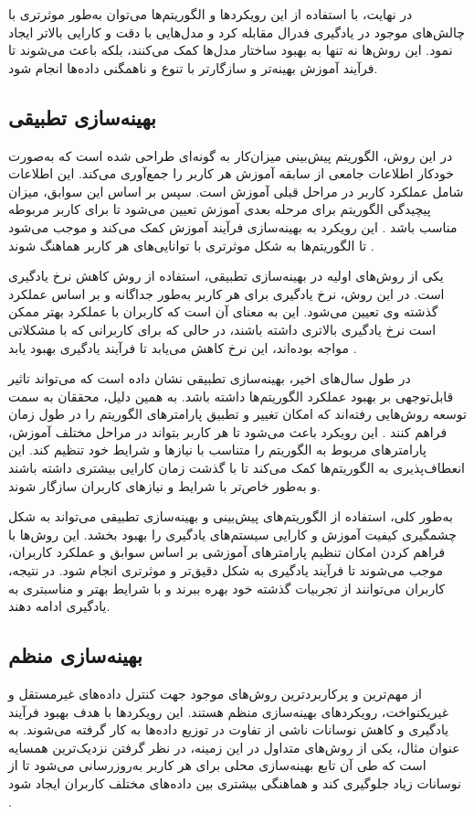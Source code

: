 در نهایت، با استفاده از این رویکردها و الگوریتم‌ها می‌توان به‌طور موثرتری با چالش‌های موجود در یادگیری فدرال مقابله کرد و مدل‌هایی با دقت و کارایی بالاتر ایجاد نمود. این روش‌ها نه تنها به بهبود ساختار مدل‌ها کمک می‌کنند، بلکه باعث می‌شوند تا فرآیند آموزش بهینه‌تر و سازگارتر با تنوع و ناهمگنی داده‌ها انجام شود.


\subsection{
	بهینه‌سازی تطبیقی%
}
در این روش، الگوریتم پیش‌بینی میزان‌کار به گونه‌ای طراحی شده است که به‌صورت خودکار اطلاعات جامعی از سابقه آموزش هر کاربر را جمع‌آوری می‌کند. این اطلاعات شامل عملکرد کاربر در مراحل قبلی آموزش است. سپس بر اساس این سوابق، میزان پیچیدگی الگوریتم برای مرحله بعدی آموزش تعیین می‌شود تا برای کاربر مربوطه مناسب باشد . این رویکرد به بهینه‌سازی فرآیند آموزش کمک می‌کند و موجب می‌شود تا الگوریتم‌ها به شکل موثرتری با توانایی‌های هر کاربر هماهنگ شوند
\cite{li2021fedsae}.

یکی از روش‌های اولیه در بهینه‌سازی تطبیقی، استفاده از روش کاهش نرخ یادگیری است. در این روش، نرخ یادگیری برای هر کاربر به‌طور جداگانه و بر اساس عملکرد گذشته وی تعیین می‌شود. این به معنای آن است که کاربران با عملکرد بهتر ممکن است نرخ یادگیری بالاتری داشته باشند، در حالی که برای کاربرانی که با مشکلاتی مواجه بوده‌اند، این نرخ کاهش می‌یابد تا فرآیند یادگیری بهبود یابد
\cite{reddi2020adaptive}.

در طول سال‌های اخیر، بهینه‌سازی تطبیقی نشان داده است که می‌تواند تاثیر قابل‌توجهی بر بهبود عملکرد الگوریتم‌ها داشته باشد. به همین دلیل، محققان به سمت توسعه روش‌هایی رفته‌اند که امکان تغییر و تطبیق پارامترهای الگوریتم را در طول زمان فراهم کنند
\cite{reddi2020adaptive}.
این رویکرد باعث می‌شود تا هر کاربر بتواند در مراحل مختلف آموزش، پارامترهای مربوط به الگوریتم را متناسب با نیازها و شرایط خود تنظیم کند. این انعطاف‌پذیری به الگوریتم‌ها کمک می‌کند تا با گذشت زمان کارایی بیشتری داشته باشند و به‌طور خاص‌تر با شرایط و نیازهای کاربران سازگار شوند.

به‌طور کلی، استفاده از الگوریتم‌های پیش‌بینی و بهینه‌سازی تطبیقی می‌تواند به شکل چشمگیری کیفیت آموزش و کارایی سیستم‌های یادگیری را بهبود بخشد. این روش‌ها با فراهم کردن امکان تنظیم پارامترهای آموزشی بر اساس سوابق و عملکرد کاربران، موجب می‌شوند تا فرآیند یادگیری به شکل دقیق‌تر و موثرتری انجام شود. در نتیجه، کاربران می‌توانند از تجربیات گذشته خود بهره ببرند و با شرایط بهتر و مناسبتری به یادگیری ادامه دهند.



\subsection{بهینه‌سازی منظم}
از مهم‌ترین و پرکاربردترین روش‌های موجود جهت کنترل داده‌های غیرمستقل و غیریکنواخت، رویکردهای بهینه‌سازی منظم هستند. این رویکردها با هدف بهبود فرآیند یادگیری و کاهش نوسانات ناشی از تفاوت در توزیع داده‌ها به کار گرفته می‌شوند. به عنوان مثال، یکی از روش‌های متداول در این زمینه، در نظر گرفتن نزدیک‌ترین همسایه است که طی آن تابع بهینه‌سازی محلی برای هر کاربر به‌روزرسانی می‌شود تا از نوسانات زیاد جلوگیری کند و هماهنگی بیشتری بین داده‌های مختلف کاربران ایجاد شود
\cite{li2020federatedheteroneneous}.

